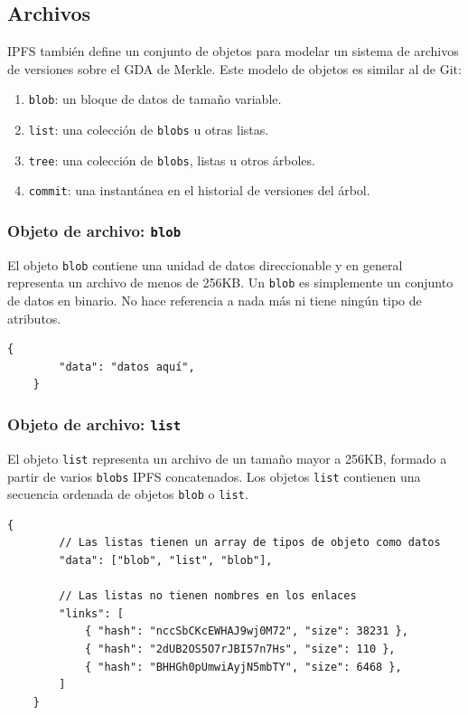 \documentclass[12pt]{article} %
\begin{document}
\subsection{Archivos} %
\label{sub:archivos}

IPFS también define un conjunto de objetos para modelar un sistema de archivos de versiones sobre el GDA de Merkle. Este modelo de objetos es similar al de Git:
\begin{enumerate}
	\item \texttt{blob}: un bloque de datos de tamaño variable.
	\item \texttt{list}: una colección de \texttt{blobs} u otras listas.
	\item \texttt{tree}: una colección de \texttt{blobs}, listas u otros árboles.
	\item \texttt{commit}: una instantánea en el historial de versiones del árbol.
\end{enumerate}

\subsubsection{Objeto de archivo: \texttt{blob}} %
\label{ssub:objeto_de_archivo_blob}

El objeto \texttt{blob} contiene una unidad de datos direccionable y en general representa un archivo de menos de 256KB. Un \texttt{blob} es simplemente un conjunto de datos en binario. No hace referencia a nada más ni tiene ningún tipo de atributos.

\begin{lstlisting}[caption={Estructura JSON de un \texttt{blob}.}]
	{
		"data": "datos aquí",
	}
\end{lstlisting}


\subsubsection{Objeto de archivo: \texttt{list}} %
\label{ssub:objeto_de_archivo_list}

El objeto \texttt{list} representa un archivo de un tamaño mayor a 256KB, formado a partir de varios \texttt{blobs} IPFS concatenados. Los objetos \texttt{list} contienen una secuencia ordenada de objetos \texttt{blob} o \texttt{list}.

\begin{lstlisting}[caption={Estructura JSON de un \texttt{list}.}]
	{
		// Las listas tienen un array de tipos de objeto como datos
		"data": ["blob", "list", "blob"],

		// Las listas no tienen nombres en los enlaces
		"links": [
			{ "hash": "nccSbCKcEWHAJ9wj0M72", "size": 38231 },
			{ "hash": "2dUB2OS5O7rJBI57n7Hs", "size": 110 },
			{ "hash": "BHHGh0pUmwiAyjN5mbTY", "size": 6468 },
		]
	}
\end{lstlisting}
\end{document}
